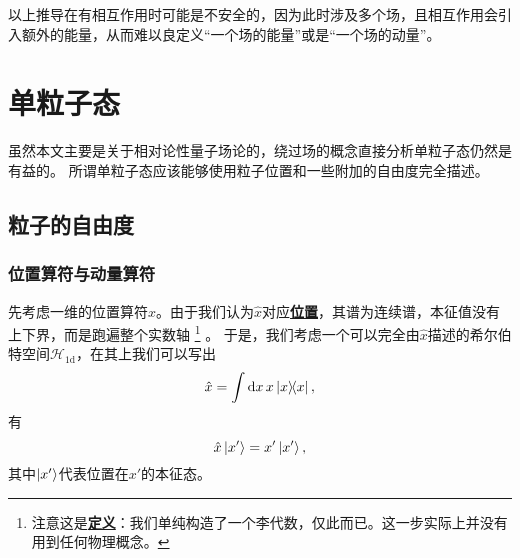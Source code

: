 \documentclass[hyperref, UTF8, a4paper]{ctexart}
\newcommand{\concept}[1]{\underline{\textbf{#1}}}
\begin{document}
以上推导在有相互作用时可能是不安全的，因为此时涉及多个场，且相互作用会引入额外的能量，从而难以良定义“一个场的能量”或是“一个场的动量”。

\section{单粒子态}\label{sec:single-particle}

虽然本文主要是关于相对论性量子场论的，绕过场的概念直接分析单粒子态仍然是有益的。
所谓单粒子态应该能够使用粒子位置和一些附加的自由度完全描述。

\subsection{粒子的自由度}\label{sec:single-particle-quantity}

\subsubsection{位置算符与动量算符}\label{sec:position-and-momentum}

先考虑一维的位置算符$\hat{x}$。由于我们认为$\hat{x}$对应\concept{位置}，其谱为连续谱，本征值没有上下界，而是跑遍整个实数轴%
\footnote{注意这是\concept{定义}：我们单纯构造了一个李代数，仅此而已。这一步实际上并没有用到任何物理概念。}%
。
于是，我们考虑一个可以完全由$\hat{x}$描述的希尔伯特空间$\mathcal{H}_{1\text{d}}$，在其上我们可以写出
\begin{equation}
    \hat{x} = \int \dd{x} x \dyad{x},
\end{equation}
有
\begin{equation}
    \hat{x} \ket{x'} = x' \ket{x'},
\end{equation}
其中$\ket{x'}$代表位置在$x'$的本征态。
\end{document}
